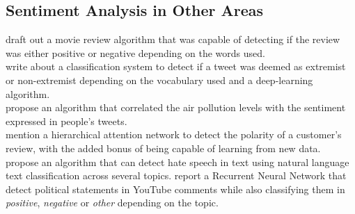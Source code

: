 \subsection{Sentiment Analysis in Other Areas}
\citet{rf5} draft out a movie review algorithm that was capable of detecting if the review was either positive or negative depending on the words used.\\
\citet{rf11} write about a classification system to detect if a tweet was deemed as extremist or non-extremist depending on the vocabulary used and a deep-learning algorithm.\\
\citet{rf12} propose an algorithm that correlated the air pollution levels with the sentiment expressed in people's tweets.\\
\citet{rf13} mention a hierarchical attention network to detect the polarity of a customer's review, with the added bonus of being capable of learning from new data.
\citet{rf15} propose an algorithm that can detect hate speech in text using natural language text classification across several topics.
\citet{rf16} report a Recurrent Neural Network that detect political statements in YouTube comments while also classifying them in \textit{positive}, \textit{negative} or \textit{other} depending on the topic.


\clearpage
